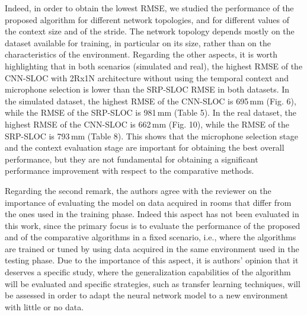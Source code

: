 \documentclass[11pt, technote, letterpaper, oneside, onecolumn]{IEEEtran}
\begin{document}
\begin{enumerate}
 Indeed, in order to obtain the lowest RMSE, we studied the performance of the proposed algorithm for different network topologies, and for different values of the context size and of the stride. The network topology depends mostly on the dataset available for training, in particular on its size, rather than on the characteristics of the environment. Regarding the other aspects, it is worth highlighting that in both scenarios (simulated and real), the highest RMSE of the CNN-SLOC with 2Rx1N architecture without using the temporal context and microphone selection is lower than the SRP-SLOC RMSE in both datasets. In the simulated dataset, the highest RMSE of the CNN-SLOC is 695\,mm (Fig. 6), while the RMSE of the SRP-SLOC is 981\,mm (Table 5). In the real dataset, the highest RMSE of the CNN-SLOC is 662\,mm (Fig. 10), while the RMSE of the SRP-SLOC is 793\,mm (Table 8). This shows that the microphone selection stage and the context evaluation stage are important for obtaining the best overall performance, but they are not fundamental for obtaining a significant performance improvement with respect to the comparative methods.
 
 


Regarding the second remark, the authors agree with the reviewer on the importance of evaluating the model on data acquired in rooms that differ from the ones used in the training phase. Indeed this aspect has not been evaluated in this work, since the primary focus is to evaluate the performance of the proposed and of the comparative algorithms in a fixed scenario, i.e., where the algorithms are trained or tuned by using data acquired in the same environment used in the testing phase. Due to the importance of this aspect, it is authors' opinion that it deserves a specific study, where the generalization capabilities of the algorithm will be evaluated and specific strategies, such as transfer learning techniques, will be assessed in order to adapt the neural network model to a new environment with little or no data. 


\end{enumerate}
\end{document}
